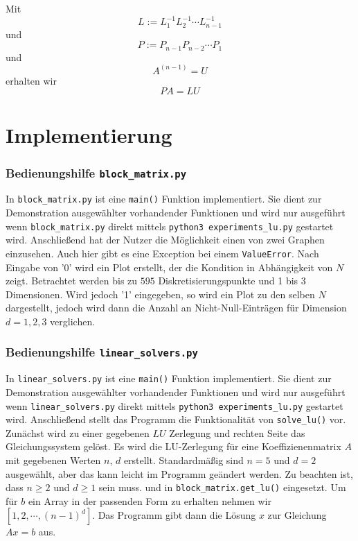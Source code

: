 \documentclass[smallheadings]{scrartcl}
\theoremstyle{definition}
\begin{document}
	
	Mit $$L:=L_{1}^{-1}L_{2}^{-1}\cdots L_{n-1}^{-1}$$
	und $$P:=P_{n-1}P_{n-2}\cdots P_1$$ und $$A^{(n-1)}=U$$
	erhalten wir $$PA=LU$$
	
	
\section{Implementierung}
\subsubsection*{Bedienungshilfe \texttt{block\_matrix.py}}
In \texttt{block\_matrix.py} ist eine \texttt{main()} Funktion implementiert. Sie dient zur Demonstration ausgewählter vorhandender Funktionen und
		wird nur ausgef\"uhrt wenn \texttt{block\_matrix.py} direkt mittels \texttt{python3 experiments\_lu.py} gestartet wird. 
Anschließend hat der Nutzer die Möglichkeit einen von zwei Graphen einzusehen. Auch hier gibt es eine Exception bei einem \texttt{ValueError}.
Nach Eingabe von '0' wird ein Plot erstellt, der die Kondition in Abhängigkeit von $N$ zeigt. Betrachtet werden bis zu $595$ Diskretisierungspunkte und 1 bis 3 Dimensionen. 
Wird jedoch '1' eingegeben, so wird ein Plot zu den selben $N$ dargestellt, jedoch wird dann die Anzahl an Nicht-Null-Einträgen für Dimension $d=1,2,3$ verglichen.
\subsubsection*{Bedienungshilfe \texttt{linear\_solvers.py}}In \texttt{linear\_solvers.py} ist eine \texttt{main()} Funktion implementiert. Sie dient zur Demonstration ausgewählter vorhandender Funktionen und
		wird nur ausgef\"uhrt wenn \texttt{linear\_solvers.py} direkt mittels \texttt{python3 experiments\_lu.py} gestartet wird. 
Anschließend stellt das Programm die Funktionalität von \texttt{solve\_lu()} vor. Zunächst wird zu einer gegebenen $LU$ Zerlegung und rechten Seite das Gleichungssystem gelöst.
Es wird die LU-Zerlegung für eine Koeffizienenmatrix $A$ mit gegebenen Werten $n$, $d$  erstellt. Standardmäßig sind $n=5$ und $d=2$ ausgewählt, aber das kann leicht im Programm geändert werden. Zu beachten ist, dass $n\geq 2$ und $d\geq 1$ sein muss. und in \texttt{block\_matrix.get\_lu()} eingesetzt. Um für $b$ ein Array in der passenden Form zu erhalten nehmen wir $[1,2,\cdots,(n-1)^d]$.
Das Programm gibt dann die Lösung $x$ zur Gleichung $Ax=b$ aus.
	
\end{document}
